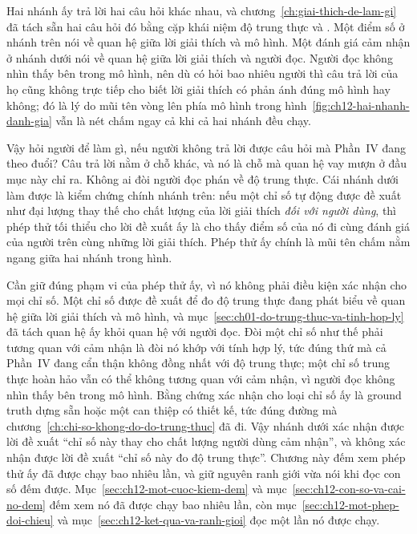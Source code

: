 Hai nhánh ấy trả lời hai câu hỏi khác nhau, và
chương~\ref{ch:giai-thich-de-lam-gi} đã tách sẵn hai câu hỏi đó bằng cặp khái
niệm độ trung thực và . Một điểm số ở nhánh trên
nói về quan hệ giữa lời giải thích và mô hình. Một đánh giá cảm nhận ở nhánh
dưới nói về quan hệ giữa lời giải thích và người đọc. Người đọc không nhìn
thấy bên trong mô hình, nên dù có hỏi bao nhiêu người thì câu trả lời của họ
cũng không trực tiếp cho biết lời giải thích có phản ánh đúng mô hình hay
không; đó là lý do mũi tên vòng lên phía mô hình trong
hình~\ref{fig:ch12-hai-nhanh-danh-gia} vẫn là nét chấm ngay cả khi cả hai
nhánh đều chạy.

Vậy hỏi người để làm gì, nếu người không trả lời được câu hỏi mà Phần~IV đang
theo đuổi? Câu trả lời nằm ở chỗ khác, và nó là chỗ mà quan hệ vay mượn ở đầu mục
này chỉ ra. Không ai đòi người đọc phán về độ trung thực. Cái nhánh dưới làm
được là kiểm chứng chính nhánh trên: nếu một chỉ số tự động được đề xuất như
đại lượng thay thế cho chất lượng của lời giải thích \emph{đối với người dùng},
thì phép thử tối thiểu cho lời đề xuất ấy là cho thấy điểm số của nó đi cùng
đánh giá của người trên cùng những lời giải thích. Phép thử ấy chính là mũi tên
chấm nằm ngang giữa hai nhánh trong hình.

Cần giữ đúng phạm vi của phép thử ấy, vì nó không phải điều kiện xác nhận cho
mọi chỉ số. Một chỉ số được đề xuất để đo độ trung thực đang phát biểu về quan
hệ giữa lời giải thích và mô hình, và mục~\ref{sec:ch01-do-trung-thuc-va-tinh-hop-ly}
đã tách quan hệ ấy khỏi quan hệ với người đọc. Đòi một chỉ số như thế phải tương
quan với cảm nhận là đòi nó khớp với tính hợp lý, tức đúng thứ mà cả Phần~IV
đang cẩn thận không đồng nhất với độ trung thực; một chỉ số trung thực hoàn hảo
vẫn có thể không tương quan với cảm nhận, vì người đọc không nhìn thấy bên trong
mô hình. Bằng chứng xác nhận cho loại chỉ số ấy là ground truth dựng sẵn hoặc
một can thiệp có thiết kế, tức đúng đường mà
chương~\ref{ch:chi-so-khong-do-do-trung-thuc} đã đi. Vậy nhánh dưới xác nhận
được lời đề xuất \enquote{chỉ số này thay cho chất lượng người dùng cảm nhận},
và không xác nhận được lời đề xuất \enquote{chỉ số này đo độ trung thực}. Chương
này đếm xem phép thử ấy đã được chạy bao nhiêu lần, và giữ nguyên ranh giới vừa
nói khi đọc con số đếm được. Mục~\ref{sec:ch12-mot-cuoc-kiem-dem} và
mục~\ref{sec:ch12-con-so-va-cai-no-dem} đếm xem nó đã được chạy bao nhiêu lần,
còn mục~\ref{sec:ch12-mot-phep-doi-chieu} và
mục~\ref{sec:ch12-ket-qua-va-ranh-gioi} đọc một lần nó được chạy.
